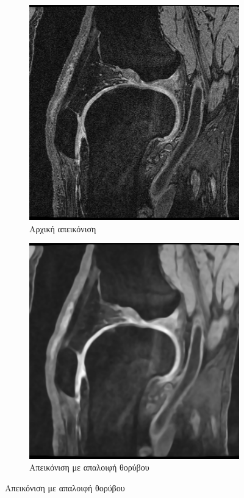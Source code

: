 \documentclass{beamer}
\begin{document}
\begin{frame}
\begin{figure}[H]
    \begin{subfigure}[t]{0.2\linewidth}
    \includegraphics[width=\linewidth]{original_1.png}
    \caption{Αρχική απεικόνιση}
    \end{subfigure}
    \begin{subfigure}[t]{0.2\linewidth}
    \includegraphics[width=\linewidth]{curvature_1.png}
    \caption{Απεικόνιση με απαλοιφή θορύβου}
    \end{subfigure}

    \label{fig:curvature_flow:1}
\end{figure}

\end{frame}
\end{document}
